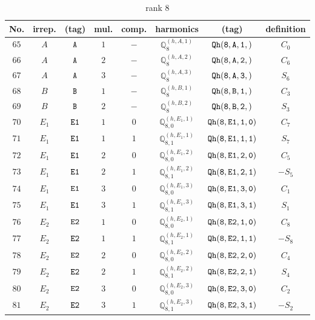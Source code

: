 \documentclass[fleqn,8pt]{jsarticle}
\begin{document}
\begin{table}[ht!]
\begin{center}
\caption{rank 8}
\renewcommand{\arraystretch}{1.3}
\begin{tabular}{cccccccc} \hline \hline
No. & irrep. & (tag) & mul. & comp. & harmonics & (tag) & definition \\ \hline
$ 65 $ & $ A $ & $ {\tt A} $ & $ 1 $ & $ - $ & $ \mathbb{Q}_{8}^{(h,A,1)} $ & $ {\tt Qh(8,A,1,)} $ & $ C_{0} $ \\
$ 66 $ & $ A $ & $ {\tt A} $ & $ 2 $ & $ - $ & $ \mathbb{Q}_{8}^{(h,A,2)} $ & $ {\tt Qh(8,A,2,)} $ & $ C_{6} $ \\
$ 67 $ & $ A $ & $ {\tt A} $ & $ 3 $ & $ - $ & $ \mathbb{Q}_{8}^{(h,A,3)} $ & $ {\tt Qh(8,A,3,)} $ & $ S_{6} $ \\
$ 68 $ & $ B $ & $ {\tt B} $ & $ 1 $ & $ - $ & $ \mathbb{Q}_{8}^{(h,B,1)} $ & $ {\tt Qh(8,B,1,)} $ & $ C_{3} $ \\
$ 69 $ & $ B $ & $ {\tt B} $ & $ 2 $ & $ - $ & $ \mathbb{Q}_{8}^{(h,B,2)} $ & $ {\tt Qh(8,B,2,)} $ & $ S_{3} $ \\
$ 70 $ & $ E_{1} $ & $ {\tt E1} $ & $ 1 $ & $ 0 $ & $ \mathbb{Q}_{8,0}^{(h,E_{1},1)} $ & $ {\tt Qh(8,E1,1,0)} $ & $ C_{7} $ \\
$ 71 $ & $ E_{1} $ & $ {\tt E1} $ & $ 1 $ & $ 1 $ & $ \mathbb{Q}_{8,1}^{(h,E_{1},1)} $ & $ {\tt Qh(8,E1,1,1)} $ & $ S_{7} $ \\
$ 72 $ & $ E_{1} $ & $ {\tt E1} $ & $ 2 $ & $ 0 $ & $ \mathbb{Q}_{8,0}^{(h,E_{1},2)} $ & $ {\tt Qh(8,E1,2,0)} $ & $ C_{5} $ \\
$ 73 $ & $ E_{1} $ & $ {\tt E1} $ & $ 2 $ & $ 1 $ & $ \mathbb{Q}_{8,1}^{(h,E_{1},2)} $ & $ {\tt Qh(8,E1,2,1)} $ & $ - S_{5} $ \\
$ 74 $ & $ E_{1} $ & $ {\tt E1} $ & $ 3 $ & $ 0 $ & $ \mathbb{Q}_{8,0}^{(h,E_{1},3)} $ & $ {\tt Qh(8,E1,3,0)} $ & $ C_{1} $ \\
$ 75 $ & $ E_{1} $ & $ {\tt E1} $ & $ 3 $ & $ 1 $ & $ \mathbb{Q}_{8,1}^{(h,E_{1},3)} $ & $ {\tt Qh(8,E1,3,1)} $ & $ S_{1} $ \\
$ 76 $ & $ E_{2} $ & $ {\tt E2} $ & $ 1 $ & $ 0 $ & $ \mathbb{Q}_{8,0}^{(h,E_{2},1)} $ & $ {\tt Qh(8,E2,1,0)} $ & $ C_{8} $ \\
$ 77 $ & $ E_{2} $ & $ {\tt E2} $ & $ 1 $ & $ 1 $ & $ \mathbb{Q}_{8,1}^{(h,E_{2},1)} $ & $ {\tt Qh(8,E2,1,1)} $ & $ - S_{8} $ \\
$ 78 $ & $ E_{2} $ & $ {\tt E2} $ & $ 2 $ & $ 0 $ & $ \mathbb{Q}_{8,0}^{(h,E_{2},2)} $ & $ {\tt Qh(8,E2,2,0)} $ & $ C_{4} $ \\
$ 79 $ & $ E_{2} $ & $ {\tt E2} $ & $ 2 $ & $ 1 $ & $ \mathbb{Q}_{8,1}^{(h,E_{2},2)} $ & $ {\tt Qh(8,E2,2,1)} $ & $ S_{4} $ \\
$ 80 $ & $ E_{2} $ & $ {\tt E2} $ & $ 3 $ & $ 0 $ & $ \mathbb{Q}_{8,0}^{(h,E_{2},3)} $ & $ {\tt Qh(8,E2,3,0)} $ & $ C_{2} $ \\
$ 81 $ & $ E_{2} $ & $ {\tt E2} $ & $ 3 $ & $ 1 $ & $ \mathbb{Q}_{8,1}^{(h,E_{2},3)} $ & $ {\tt Qh(8,E2,3,1)} $ & $ - S_{2} $ \\
 \hline \hline
\end{tabular}
\end{center}
\end{table}
\end{document}
